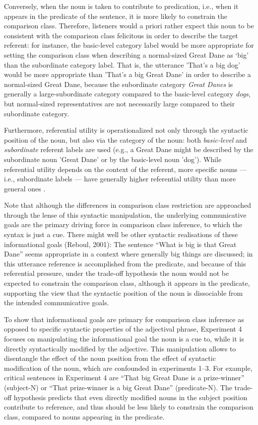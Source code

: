  Conversely, when the noun is taken to contribute to predication, i.e., when it appears in the predicate of the sentence, it is more likely to constrain the comparison class. Therefore, listeners would a priori rather expect this noun to be consistent with the comparison class felicitous in order to describe the target referent: for instance, the basic-level category label would be more appropriate for setting the comparison class when describing a normal-sized Great Dane as ‘big’ than the subordinate category label. That is, the utterance 'That's a big dog' would be more appropriate than 'That's a big Great Dane' in order to describe a normal-sized Great Dane, because the subordinate category \emph{Great Danes} is generally a large-subordinate category compared to the basic-level category \emph{dogs}, but normal-sized representatives are not necessarily large compared to their subordinate category. 

Furthermore, referential utility is operationalized not only through the syntactic position of the noun, but also via the category of the noun: both \emph{basic-level} and \emph{subordinate} referent labels are used (e.g., a Great Dane might be described by the subordinate noun 'Great Dane' or by the basic-level noun 'dog'). While referential utility depends on the context of the referent, more specific nouns --- i.e., subordinate labels --- have generally higher referential utility than more general ones \parencite{graf2016animal}. 

Note that although the differences in comparison class restriction are approached through the lense of this syntactic manipulation, the underlying communicative goals are the primary driving force in comparison class inference, to which the syntax is just a cue. 
There might well be other syntactic realisations of these informational goals (Reboul, 2001): The sentence “What is big is that Great Dane” seems appropriate in a context where generally big things are discussed; in this utterance reference is accomplished from the predicate, and because of this referential pressure, under the trade-off hypothesis the noun would not be expected to constrain the comparison class, although it appears in the predicate, supporting the view that the syntactic position of the noun is dissociable from the intended communicative goals.

To show that informational goals are primary for comparison class inference as opposed to specific syntactic properties of the adjectival phrase, Experiment 4 focuses on manipulating the informational goal the noun is a cue to, while it is directly syntactically modified by the adjective. This manipulation allows to disentangle the effect of the noun position from the effect of syntactic modification of the noun, which are confounded in experiments 1--3. For example, critical sentences in Experiment 4 are “That big Great Dane is a prize-winner” (subject-N) or “That prize-winner is a big Great Dane” (predicate-N). The trade-off hypothesis predicts that even directly modified nouns in the subject position contribute to reference, and thus should be less likely to constrain the comparison class, compared to nouns appearing in the predicate.

